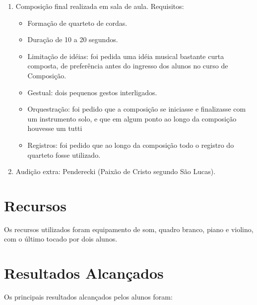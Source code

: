 \documentclass[12pt]{article}
\begin{document}
\begin{enumerate}
\item Composição final realizada em sala de aula. Requisitos:
  \begin{itemize}
  \item Formação de quarteto de cordas.
  \item Duração de 10 a 20 segundos.
  \item Limitação de idéias: foi pedida uma idéia musical bastante curta
    composta, de preferência antes do ingresso dos alunos no curso de
    Composição.
  \item Gestual: dois pequenos gestos interligados.
  \item Orquestração: foi pedido que a composição se iniciasse e
    finalizasse com um instrumento solo, e que em algum ponto ao longo
    da composição houvesse um tutti
  \item Registros: foi pedido que ao longo da composição todo o registro
    do quarteto fosse utilizado.
  \end{itemize}

\item Audição extra: Penderecki (Paixão de Cristo segundo São Lucas).
\end{enumerate}

\section{Recursos}
\label{sec:recursos}

Os recursos utilizados foram equipamento de som, quadro branco, piano
e violino, com o último tocado por dois alunos.

\section{Resultados Alcançados}
\label{sec:result-alcanc}

Os principais resultados alcançados pelos alunos foram:
\end{document}
